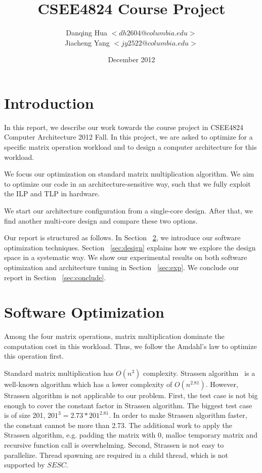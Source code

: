 \documentclass[twocolumn,letterpaper,10pt]{article}
\title{CSEE4824 Course Project}
\author{Danqing Hua $<dh2604@columbia.edu>$\\
  Jiacheng Yang $<jy2522@columbia.edu>$}
\date{December 2012}
\begin{document}
\maketitle

\section{Introduction}
\label{sec:intro}

In this report, we describe our work towards the course project in
CSEE4824 Computer Architecture 2012 Fall. In this project, we are asked to optimize for a specific matrix
operation workload and to design a computer architecture for this
workload.

We focus our optimization on standard matrix multiplication
algorithm. We aim to optimize our code in an architecture-sensitive
way, such that we fully exploit the ILP and TLP in hardware.

We start our architecture configuration from a single-core design. After that, we find
another multi-core design and compare these two options.

Our report is structured as follows. In Section ~\ref{sec:software}, we introduce our software optimization
techniques. Section ~\ref{sec:design} explains how we explore the
design space in a systematic way. We show our experimental results on
both software optimization and architecture tuning in Section
~\ref{sec:exp}. We conclude our report in Section ~\ref{sec:conclude}.

\section{Software Optimization}
\label{sec:software}

Among the four matrix operations, matrix
multiplication dominate the computation cost in this workload.
Thus, we follow the Amdahl's law to optimize this operation first.

Standard matrix multiplication has $O(n^3)$ complexity. Strassen
algorithm~\cite{CLRS} is a well-known algorithm which has a lower
complexity of $O(n^{2.81})$. However, Strassen algorithm is not applicable to our problem. First, the test
case is not big enough to cover the constant factor in Strassen
algorithm. The biggest test case is of size 201, $201^3 = 2.73 *
201^{2.81}$. In order to make Strassen algorithm faster, the
constant cannot be more than 2.73. The additional work
to apply the Strassen algorithm, e.g. padding the matrix with 0, malloc
temporary matrix and recursive function call is overwhelming. Second, Strassen is not
easy to parallelize. Thread spawning are required in a child thread,
which is not supported by $SESC$.
\end{document}
